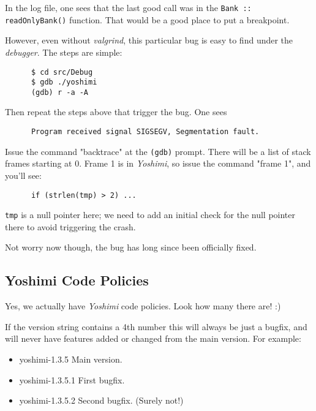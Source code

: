    In the log file, one sees that the last good call was in the
   \texttt{Bank :: readOnlyBank()} function.  That would be a good place to
   put a breakpoint.

   However, even without \textsl{valgrind}, this particular bug is easy to
   find under the \textsl{debugger}.  The steps are simple:

   \begin{verbatim}
      $ cd src/Debug
      $ gdb ./yoshimi
      (gdb) r -a -A
   \end{verbatim}

   Then repeat the steps above that trigger the bug.
   One sees

   \begin{verbatim}
      Program received signal SIGSEGV, Segmentation fault.
   \end{verbatim}

   Issue the command "backtrace" at the \texttt{(gdb)} prompt.  There will
   be a list of stack frames starting at 0.  Frame 1 is in \textsl{Yoshimi},
   so issue the command "frame 1", and you'll see:

   \begin{verbatim}
      if (strlen(tmp) > 2) ...
   \end{verbatim}

   \texttt{tmp} is a null pointer here; we need to add an initial check for
   the null pointer there to avoid triggering the crash.

   Not worry now though, the bug has long since been officially fixed.

\subsection{Yoshimi Code Policies}
\label{subsec:yoshimi_code_policies}

   Yes, we actually have \textsl{Yoshimi} code policies.
   Look how many there are! :)

   If the version string contains a 4th number this will always be just a
   bugfix, and will never have features added or changed from the main version.
   For example:

   \begin{itemize}
      \item yoshimi-1.3.5   Main version.
      \item yoshimi-1.3.5.1 First bugfix.
      \item yoshimi-1.3.5.2 Second bugfix. (Surely not!)
   \end{itemize}

